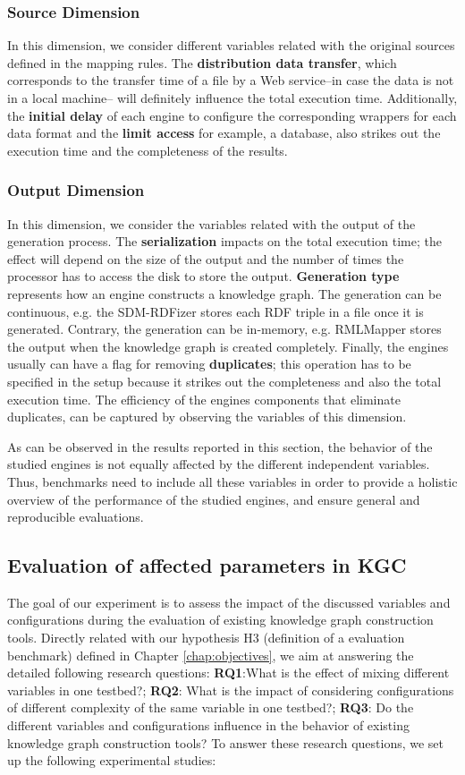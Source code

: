 \subsubsection{Source Dimension}
In this dimension, we consider different variables related with the original sources defined in the mapping rules. The \textbf{distribution data transfer}, which corresponds to the transfer time of a file by a Web service--in case the data is not in a local machine-- will definitely influence the total execution time. Additionally, the \textbf{initial delay} of each engine to configure the corresponding wrappers for each data format and the \textbf{limit access} for example, a database, also strikes out the execution time and the completeness of the results.

\subsubsection{Output Dimension}
In this dimension, we consider the variables related with the output of the generation process. The \textbf{serialization} impacts on the total execution time; the effect will depend on the size of the output and the number of times the processor has to access the disk to store the output. \textbf{Generation type} represents how an engine constructs a knowledge graph. The generation can be continuous, e.g. the SDM-RDFizer stores each RDF triple in a file once it is generated. Contrary, the generation can be in-memory, e.g. RMLMapper stores the output when the knowledge graph is created completely. Finally, the engines usually can have a flag for removing \textbf{duplicates}; this operation has to be specified in the setup because it strikes out the completeness and also the total execution time. The efficiency of the engines components that eliminate duplicates, can be captured by observing the variables of this dimension.   

As can be observed in the results reported in this section, the behavior of the studied engines is not equally affected by the different independent variables. Thus, benchmarks need to include all these variables in order to provide a holistic overview of the performance of the studied engines, and ensure general and reproducible evaluations. 


\subsection{Evaluation of affected parameters in KGC}
The goal of our experiment is to assess the impact of the discussed variables and configurations during the evaluation of existing knowledge graph construction tools. Directly related with our hypothesis H3 (definition of a evaluation benchmark) defined in Chapter \ref{chap:objectives}, we aim at answering the detailed following research questions: \textbf{RQ1}:What is the effect of mixing different variables in one testbed?; \textbf{RQ2}: What is the impact of considering configurations of different complexity of the same variable in one testbed?; \textbf{RQ3}: Do the different variables and configurations influence in the behavior of existing knowledge graph construction tools? To answer these research questions, we set up the following experimental studies:

